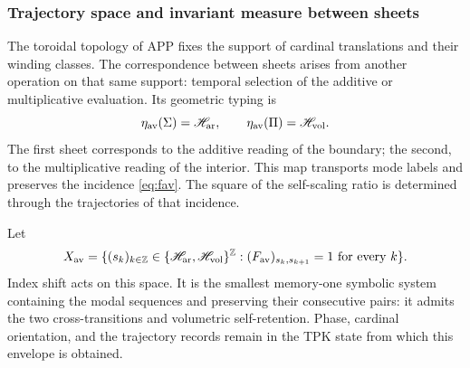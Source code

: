 \subsubsection{Trajectory space and invariant measure between sheets}
\label{sec:medida-retorno-hojas}

The toroidal topology of APP fixes the support of cardinal translations
and their winding classes. The correspondence between sheets arises from
another operation on that same support: temporal selection of the
additive or multiplicative evaluation. Its geometric typing is
\[
 \eta_{\rm av}(\Sigma)=\mathscr H_{\rm ar},\qquad
 \eta_{\rm av}(\Pi)=\mathscr H_{\rm vol}.
\]
The first sheet corresponds to the additive reading of the boundary; the second,
to the multiplicative reading of the interior. This map transports mode
labels and preserves the incidence \eqref{eq:fav}. The square of the self-scaling
ratio is determined through the trajectories of that incidence.

\begin{definition}
Let
\[
 X_{\rm av}=\{(s_k)_{k\in\mathbb Z}\in
 \{\mathscr H_{\rm ar},\mathscr H_{\rm vol}\}^{\mathbb Z}:
 (F_{\rm av})_{s_k,s_{k+1}}=1\text{ for every }k\}.
\]
Index shift acts on this space. It is the smallest
memory-one symbolic system containing the modal sequences and preserving
their consecutive pairs: it admits the two cross-transitions and
volumetric self-retention. Phase, cardinal orientation, and the trajectory
records remain in the TPK state from which this
envelope is obtained.
\end{definition}

